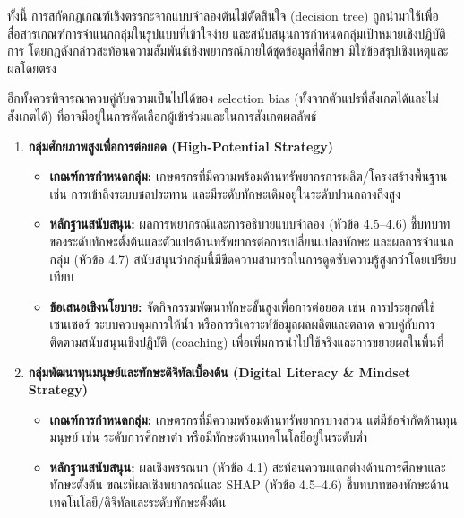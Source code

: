 ทั้งนี้ การสกัดกฎเกณฑ์เชิงตรรกะจากแบบจำลองต้นไม้ตัดสินใจ (decision tree) ถูกนำมาใช้เพื่อสื่อสารเกณฑ์การจำแนกกลุ่มในรูปแบบที่เข้าใจง่าย และสนับสนุนการกำหนดกลุ่มเป้าหมายเชิงปฏิบัติการ โดยกฎดังกล่าวสะท้อนความสัมพันธ์เชิงพยากรณ์ภายใต้ชุดข้อมูลที่ศึกษา มิใช่ข้อสรุปเชิงเหตุและผลโดยตรง

อีกทั้งควรพิจารณาควบคู่กับความเป็นไปได้ของ selection bias (ทั้งจากตัวแปรที่สังเกตได้และไม่สังเกตได้) ที่อาจมีอยู่ในการคัดเลือกผู้เข้าร่วมและในการสังเกตผลลัพธ์

\begin{enumerate}

\item \textbf{กลุ่มศักยภาพสูงเพื่อการต่อยอด (High-Potential Strategy)}

\begin{itemize}
\item \textbf{เกณฑ์การกำหนดกลุ่ม:} เกษตรกรที่มีความพร้อมด้านทรัพยากรการผลิต/โครงสร้างพื้นฐาน เช่น การเข้าถึงระบบชลประทาน และมีระดับทักษะเดิมอยู่ในระดับปานกลางถึงสูง

\item \textbf{หลักฐานสนับสนุน:} ผลการพยากรณ์และการอธิบายแบบจำลอง (หัวข้อ 4.5–4.6) ชี้บทบาทของระดับทักษะตั้งต้นและตัวแปรด้านทรัพยากรต่อการเปลี่ยนแปลงทักษะ และผลการจำแนกกลุ่ม (หัวข้อ 4.7) สนับสนุนว่ากลุ่มนี้มีขีดความสามารถในการดูดซับความรู้สูงกว่าโดยเปรียบเทียบ

\item \textbf{ข้อเสนอเชิงนโยบาย:} จัดกิจกรรมพัฒนาทักษะขั้นสูงเพื่อการต่อยอด เช่น การประยุกต์ใช้เซนเซอร์ ระบบควบคุมการให้น้ำ หรือการวิเคราะห์ข้อมูลผลผลิตและตลาด ควบคู่กับการติดตามสนับสนุนเชิงปฏิบัติ (coaching) เพื่อเพิ่มการนำไปใช้จริงและการขยายผลในพื้นที่

\end{itemize}

\item \textbf{กลุ่มพัฒนาทุนมนุษย์และทักษะดิจิทัลเบื้องต้น (Digital Literacy \& Mindset Strategy)}

\begin{itemize}
\item \textbf{เกณฑ์การกำหนดกลุ่ม:} เกษตรกรที่มีความพร้อมด้านทรัพยากรบางส่วน แต่มีข้อจำกัดด้านทุนมนุษย์ เช่น ระดับการศึกษาต่ำ หรือมีทักษะด้านเทคโนโลยีอยู่ในระดับต่ำ

\item \textbf{หลักฐานสนับสนุน:} ผลเชิงพรรณนา (หัวข้อ 4.1) สะท้อนความแตกต่างด้านการศึกษาและทักษะตั้งต้น ขณะที่ผลเชิงพยากรณ์และ SHAP (หัวข้อ 4.5–4.6) ชี้บทบาทของทักษะด้านเทคโนโลยี/ดิจิทัลและระดับทักษะตั้งต้น


\end{itemize}
\end{enumerate}
